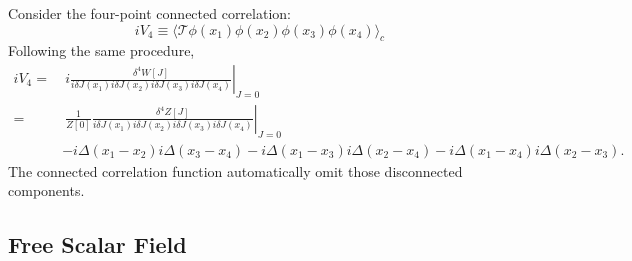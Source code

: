 \documentclass[aps,prb,superscriptaddress,nofootinbib]{revtex4}
\begin{document}
Consider the four-point connected correlation:
\begin{equation}
	iV_4 \equiv \langle \mathcal{T}\phi(x_1) \phi(x_2) \phi(x_3) \phi(x_4)\rangle_c
\end{equation}
Following the same procedure,
\begin{equation}
\begin{aligned}
	iV_4 
	=&\ i\left.\frac{\delta^4 W[J]}{i\delta J(x_1)i\delta J(x_2)i\delta J(x_3)i\delta J(x_4)}\right|_{J=0} \\
	=&\ \frac{1}{Z[0]}\left.\frac{\delta^4 Z[J]}{i\delta J(x_1)i\delta J(x_2)i\delta J(x_3)i\delta J(x_4)}\right|_{J=0} \\
	&-i\Delta(x_1-x_2) i\Delta(x_3-x_4) -i\Delta(x_1-x_3) i\Delta(x_2-x_4) -i\Delta(x_1-x_4) i\Delta(x_2-x_3).
\end{aligned}
\end{equation}
The connected correlation function automatically omit those disconnected components.

\subsection{Free Scalar Field}
\end{document}
